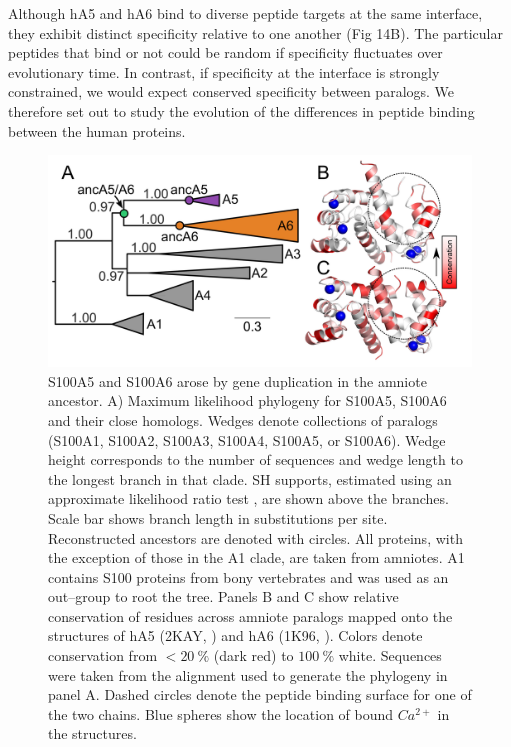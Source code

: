 Although hA5 and hA6 bind to diverse peptide targets at the same interface,
they exhibit distinct specificity relative to one another (Fig 14B).
The particular peptides that bind or not could be random if specificity
fluctuates over evolutionary time. In contrast, if specificity at
the interface is strongly constrained, we would expect conserved specificity
between paralogs. We therefore set out to study the evolution of the
differences in peptide binding between the human proteins. 

\begin{figure}
\centering
	\includegraphics{ch5-fig3.png} 
\caption[S100A5 and S100A6 arose by gene duplication]{S100A5 and S100A6 arose by gene duplication in the
amniote ancestor. A) Maximum likelihood phylogeny for S100A5, S100A6
and their close homologs. Wedges denote collections of paralogs (S100A1,
S100A2, S100A3, S100A4, S100A5, or S100A6). Wedge height corresponds
to the number of sequences and wedge length to the longest branch
in that clade. SH supports, estimated using an approximate likelihood
ratio test \citep{guindon_new_2010}, are shown above the branches.
Scale bar shows branch length in substitutions per site. Reconstructed
ancestors are denoted with circles. All proteins, with the exception
of those in the A1 clade, are taken from amniotes. A1 contains S100
proteins from bony vertebrates and was used as an out--group to root
the tree. Panels B and C show relative conservation of residues across
amniote paralogs mapped onto the structures of hA5 (2KAY, \citep{bertini_solution_2009})
and hA6 (1K96, \citep{otterbein_crystal_2002}). Colors denote conservation
from $<20\ \%$ (dark red) to $100\ \%$ white. Sequences were taken
from the alignment used to generate the phylogeny in panel A. Dashed
circles denote the peptide binding surface for one of the two chains.
Blue spheres show the location of bound $Ca^{2+}$ in the structures.\label{samplefigure}}	
\end{figure}

